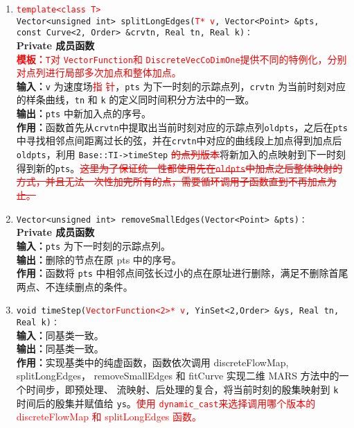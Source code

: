 \documentclass[a4paper,twoside]{ctexart}
\begin{document}
\begin{itemize}
\begin{enumerate}[(1)]
                \item \textcolor{red}{\texttt{template<class T>}}\\\texttt{Vector<unsigned int> splitLongEdges(}\textcolor{red}{\texttt{T* v}}\texttt{, Vector<Point> \&pts,\\ const Curve<2, Order> \&crvtn, Real tn, Real k)：}\\
                  \textbf{Private 成员函数}\\
                  \textcolor{red}{\textbf{模板：}\texttt{T}对
                    \texttt{VectorFunction}和
                    \texttt{DiscreteVecCoDimOne}提供不同的特例化，分别
                    对点列进行局部多次加点和整体加点。}\\
                \textbf{输入：}\texttt{v} 为速度场\textcolor{red}{指
                  针}，\texttt{pts} 为下一时刻的示踪点列，\texttt{crvtn} 为当前时刻对应的样条曲线，\texttt{tn} 和 \texttt{k} 的定义同时间积分方法中的一致。\\
                \textbf{输出：}\texttt{pts} 中新加入点的序号。\\
                \textbf{作用：}函数首先从\texttt{crvtn}中提取出当前时刻对应的示踪点列\texttt{oldpts}，之后在\texttt{pts}中寻找相邻点间距离过长的弦，并在\texttt{crvtn}中对应的曲线段上加点得到加点后\texttt{oldpts}，利用 \texttt{Base::TI->timeStep} \textcolor{red}{\sout{的点列版本}}将新加入的点映射到下一时刻得到新的\texttt{pts}。\textcolor{red}{\sout{这里为了保证统一性都使用先在\texttt{oldpts}中加点之后整体映射的方式，并且无法一次性加完所有的点，需要循环调用子函数直到不再加点为止。}}
                \item \texttt{Vector<unsigned int> removeSmallEdges(Vector<Point> \&pts)：}\\
                \textbf{Private 成员函数}\\
                \textbf{输入：}\texttt{pts} 为下一时刻的示踪点列。\\
                \textbf{输出：}删除的节点在原 pts 中的序号。\\
                \textbf{作用：}函数将 \texttt{pts} 中相邻点间弦长过小的点在原址进行删除，满足不删除首尾两点、不连续删点的条件。
                \item \texttt{void timeStep(}\textcolor{red}{\texttt{VectorFunction<2>* v}}\texttt{, YinSet<2,Order> \&ys, Real tn, Real k)：}\\
                \textbf{输入：}同基类一致。\\
                \textbf{输出：}同基类一致。\\
                \textbf{作用：}实现基类中的纯虚函数，函数依次调用
                discreteFlowMap, splitLongEdges， removeSmallEdges 和
                fitCurve 实现二维 MARS 方法中的一个时间步，即预处理、
                流映射、后处理的复合，将当前时刻的殷集映射到
                \texttt{k} 时间后的殷集并赋值给 \texttt{ys}。\textcolor{red}{使用
                \texttt{dynamic\_cast}来选择调用哪个版本的
                discreteFlowMap 和 splitLongEdges 函数。}
            \end{enumerate}
          \end{itemize}




\end{document}
